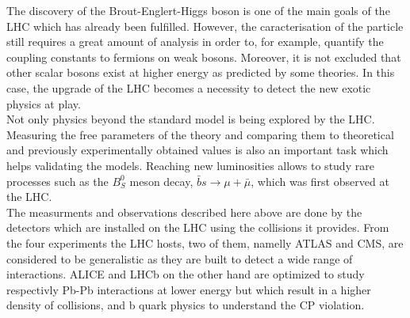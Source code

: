     The discovery of the Brout-Englert-Higgs boson is one of the main goals of the LHC which has already been fulfilled. However, the caracterisation of the particle still requires a great amount of analysis in order to, for example, quantify the coupling constants to fermions on weak bosons. Moreover, it is not excluded that other scalar bosons exist at higher energy as predicted by some theories. In this case, the upgrade of the LHC becomes a necessity to detect the new exotic physics at play. \\

    Not only physics beyond the standard model is being explored by the LHC. Measuring the free parameters of the theory and comparing them to theoretical and previously experimentally obtained values is also an important task which helps validating the models. Reaching new luminosities allows to study rare processes such as the $ B^0_S $ meson decay, $ \bar{b}s \rightarrow \mu + \bar{\mu} $, which was first observed at the LHC. \\

    The measurments and observations described here above are done by the detectors which are installed on the LHC using the collisions it provides. From the four experiments the LHC hosts, two of them, namelly ATLAS and CMS, are considered to be generalistic as they are built to detect a wide range of interactions. ALICE and LHCb on the other hand are optimized to study respectivly Pb-Pb interactions at lower energy but which result in a higher density of collisions, and b quark physics to understand the CP violation.
